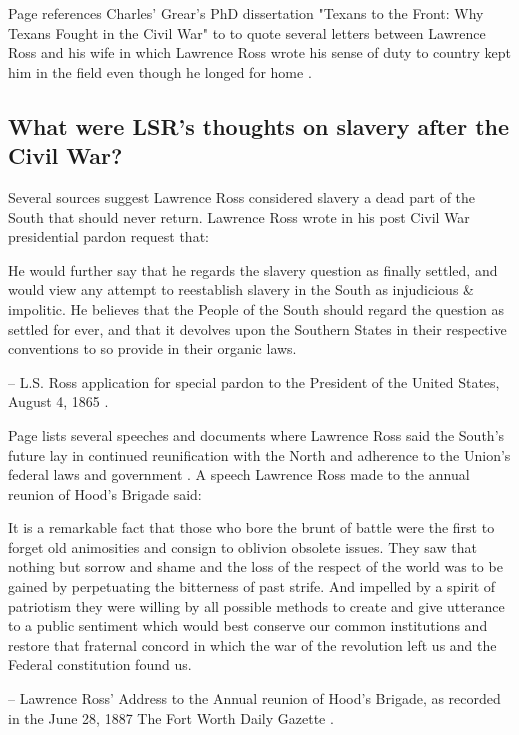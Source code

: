 \documentclass[12pt]{article}
\begin{document}
Page references Charles' Grear's PhD dissertation "Texans to the Front: Why Texans Fought in the Civil War" to to quote several letters between Lawrence Ross and his wife in which Lawrence Ross wrote his sense of duty to country kept him in the field even though he longed for home \cite[pg. 59--60]{page}.

\newpage
\subsection{What were LSR's thoughts on slavery after the Civil War?}
Several sources suggest Lawrence Ross considered slavery a dead part of the South that should never return. Lawrence Ross wrote in his post Civil War presidential pardon request that:

\begin{displayquote}
He would further say that he regards the slavery question as finally settled, and would view any attempt to reestablish slavery in the South as injudicious \& impolitic.  He believes that the People of the South should regard the question as settled for ever, and that it devolves upon the Southern States in their respective conventions to so provide in their organic laws.

-- L.S. Ross application for special pardon to the President of the United States, August 4, 1865 \cite{pardonrequest}.
\end{displayquote}

Page lists several speeches and documents where Lawrence Ross said the South's future lay in continued reunification with the North and adherence to the Union's federal laws and government \cite[pg. 161--167]{page}. A speech Lawrence Ross made to the annual reunion of Hood's Brigade said:

\begin{displayquote}
It is a remarkable fact that those who bore the brunt of battle were the first to forget old animosities and consign to oblivion obsolete issues.  They saw that nothing but sorrow and shame and the loss of the respect of the world was to be gained by perpetuating the bitterness of past strife.  And impelled by a spirit of patriotism they were willing by all possible methods to create and give utterance to a public sentiment which would best conserve our common institutions and restore that fraternal concord in which the war of the revolution left us and the Federal constitution found us.

-- Lawrence Ross' Address to the Annual reunion of Hood's Brigade, as recorded in the June 28, 1887 The Fort Worth Daily Gazette \cite{fwg:1887-06-28}.
\end{displayquote}
\end{document}

